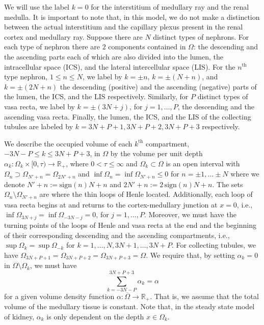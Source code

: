 \documentclass{article}
\begin{document}
We will use the label
$k=0$ for the interstitium of medullary ray and the renal medulla.
It is important to note that, in this model, we do not make a distinction between the actual interstitium and the capillary plexus present in the renal cortex and medullary ray.
Suppose there are $N$ distinct types of nephrons.
For each type of nephron there are $2$ components contained in $\Omega$: the descending and the ascending parts each of which are also divided into the lumen, the intracellular space (ICS), and the lateral intercellular space (LIS).
For the $n^{\mathrm{th}}$ type nephron, $1\leq n\leq N$, we label by $k=\pm n$, $k=\pm(N+n)$, and $k=\pm(2N+n)$ the descending (positive) and the ascending (negative) parts of the lumen, the ICS, and the LIS respectively.
Similarly, for $P$ distinct types of vasa recta, we label by $k=\pm(3N+j)$, for $j=1,\dots,P$, the descending and the ascending vasa recta.
Finally, the lumen, the ICS, and the LIS of the collecting tubules are labeled by $k=3N+P+1,3N+P+2,3N+P+3$ respectively.

We describe the occupied volume of each $k^{\mathrm{th}}$ compartment, $-3N-P\leq k\leq 3N+P+3$, in $\Omega$ by the volume per unit depth $\alpha_k:\Omega_k\times [0,\tau)\to \mathbb{R}_+$, where $0<\tau\leq \infty$ and $\Omega_k\subset\Omega$ is an open interval with $\Omega_{n} \supset \Omega_{N'+n} = \Omega_{2N'+n}$ and $\inf\Omega_n = \inf\Omega_{N'+n}\leq 0$ for $n=\pm 1,\dots\pm N$ where we denote $N'+n := \mathrm{sign}(n)N+n$ and $2N'+n := 2\, \mathrm{sign}(n)N+n$.
The sets $\Omega_n\setminus \Omega_{N'+n}$ are where the thin loops of Henle located.
Additionally, each loop of vasa recta begins at and returns to the cortex-medullary junction at $x=0$, i.e., $\inf \Omega_{3N+j} = \inf \Omega_{-3N-j}=0$, for $j=1,\dots,P$.
Moreover, we must have the turning points of the loops of Henle and vasa recta at the end and the beginning of their corresponding descending and the ascending compartments, i.e., $\sup\Omega_k = \sup\Omega_{-k}$ for $k=1,\dots,N,3N+1,\dots,3N+P$.
For collecting tubules, we have $\Omega_{3N+P+1}=\Omega_{3N+P+2}=\Omega_{3N+P+3}=\Omega$.
We require that, by setting $\alpha_k=0$ in $\Omega\setminus\Omega_k$, we must have
\begin{equation}\label{eq:const_vol}
    \sum_{k=-3N-P}^{3N+P+3} \alpha_k = \alpha
\end{equation}
    for a given volume density function $\alpha:\overline{\Omega}\to\mathbb{R}_+$.
That is, we assume that the total volume of the medullary tissue is constant.
Note that, in the steady state model of kidney, $\alpha_k$ is only dependent on the depth $x\in \Omega_k$.
\end{document}
